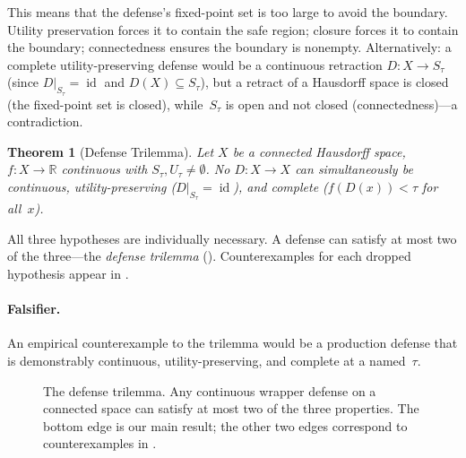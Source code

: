 \documentclass[11pt]{article}
\newtheorem{theorem}{Theorem}[section]
\newcommand{\R}{\mathbb{R}}
\newcommand{\id}{\operatorname{id}}
\begin{document}
This means that the defense's fixed-point set is too large to avoid the
boundary. Utility preservation forces it to contain the safe region;
closure forces it to contain the boundary; connectedness ensures the
boundary is nonempty. Alternatively: a complete utility-preserving
defense would be a continuous retraction $D\colon X \to S_\tau$
(since $D|_{S_\tau} = \id$ and $D(X) \subseteq S_\tau$), but a
retract of a Hausdorff space is closed (the fixed-point set is
closed), while~$S_\tau$ is open and not closed
(connectedness)---a contradiction.

\begin{theorem}[Defense Trilemma]
\label{thm:trilemma}
Let $X$ be a connected Hausdorff space, $f\colon X \to \R$ continuous
with $S_\tau, U_\tau \neq \emptyset$. No $D\colon X \to X$ can
simultaneously be continuous, utility-preserving ($D|_{S_\tau} = \id$),
and complete ($f(D(x)) < \tau$ for all~$x$).
\end{theorem}

All three hypotheses are individually necessary. A defense can satisfy
at most two of the three---the \emph{defense trilemma}
(). Counterexamples for each dropped hypothesis
appear in .

\paragraph{Falsifier.}
An empirical counterexample to the trilemma would be a production
defense that is demonstrably continuous, utility-preserving, and
complete at a named~$\tau$.

\begin{figure}[t]
\centering
{}
\caption{The defense trilemma. Any continuous wrapper defense on a
connected space can satisfy at most two of
the three properties. The bottom edge is our main result; the other
two edges correspond to counterexamples in .}
\label{fig:trilemma}
\end{figure}
\end{document}
